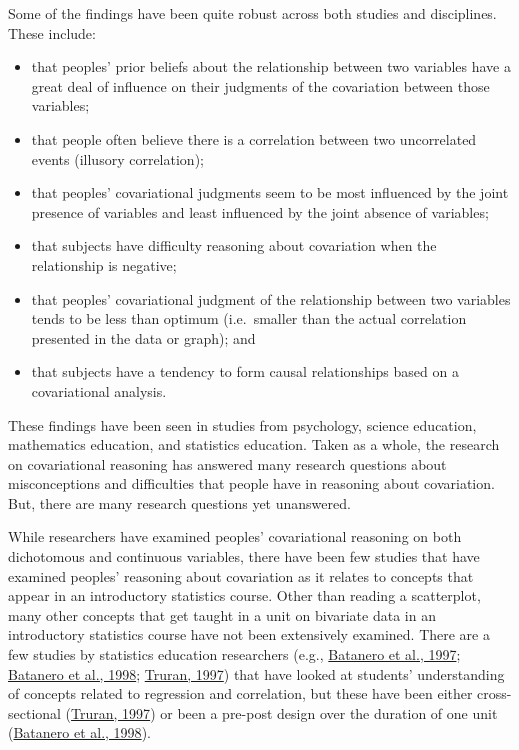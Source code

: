 \documentclass[11pt]{umnthesis}
\begin{document}
Some of the findings have been quite robust across both studies and disciplines. These include:

\begin{itemize}
\tightlist
\item
  that peoples' prior beliefs about the relationship between two variables have a great deal of influence on their judgments of the covariation between those variables;
\item
  that people often believe there is a correlation between two uncorrelated events (illusory correlation);
\item
  that peoples' covariational judgments seem to be most influenced by the joint presence of variables and least influenced by the joint absence of variables;
\item
  that subjects have difficulty reasoning about covariation when the relationship is negative;
\item
  that peoples' covariational judgment of the relationship between two variables tends to be less than optimum (i.e.~smaller than the actual correlation presented in the data or graph); and
\item
  that subjects have a tendency to form causal relationships based on a covariational analysis.
\end{itemize}

These findings have been seen in studies from psychology, science education, mathematics education, and statistics education. Taken as a whole, the research on covariational reasoning has answered many research questions about misconceptions and difficulties that people have in reasoning about covariation. But, there are many research questions yet unanswered.

While researchers have examined peoples' covariational reasoning on both dichotomous and continuous variables, there have been few studies that have examined peoples' reasoning about covariation as it relates to concepts that appear in an introductory statistics course. Other than reading a scatterplot, many other concepts that get taught in a unit on bivariate data in an introductory statistics course have not been extensively examined. There are a few studies by statistics education researchers (e.g., \protect\hyperlink{ref-batanero:1997}{Batanero et al., 1997}; \protect\hyperlink{ref-batanero:1998}{Batanero et al., 1998}; \protect\hyperlink{ref-truran:1997}{Truran, 1997}) that have looked at students' understanding of concepts related to regression and correlation, but these have been either cross-sectional (\protect\hyperlink{ref-truran:1997}{Truran, 1997}) or been a pre-post design over the duration of one unit (\protect\hyperlink{ref-batanero:1998}{Batanero et al., 1998}).
\end{document}
